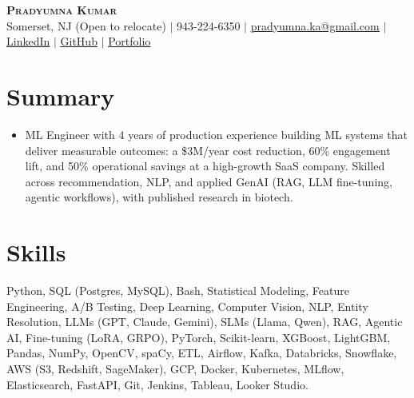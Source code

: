 \documentclass[letterpaper,11pt]{article}
\newcommand{\resumeSubHeadingListStart}{\begin{itemize}[leftmargin=0.15in, label={}]}
\newcommand{\resumeSubHeadingListEnd}{\end{itemize}}
\begin{document}
\begin{center}
    \textbf{\huge \scshape Pradyumna Kumar} \\ \vspace{2pt}
     \small Somerset, NJ (Open to relocate) $|$ \small 943-224-6350 $|$ \href{mailto:pradyumna.ka@gmail.com}{\underline{pradyumna.ka@gmail.com}} $|$
    \href{https://linkedin.com/in/pradyum-kumar/}{\underline{LinkedIn}} $|$
    \href{https://github.com/prad101}{\underline{GitHub}} $|$
    \href{https://prad101.github.io/portfolio/}{\underline{Portfolio}}
\end{center}

\section{Summary}
{\footnotesize
  \resumeSubHeadingListStart
        \item{ML Engineer with 4 years of production experience building ML systems that deliver measurable outcomes: a \$3M/year cost reduction, 60\% engagement lift, and 50\% operational savings at a high-growth SaaS company. Skilled across recommendation, NLP, and applied GenAI (RAG, LLM fine-tuning, agentic workflows), with published research in biotech.}
    \vspace{-5pt}
  \resumeSubHeadingListEnd
}
 \section{Skills}
 \begin{itemize}[leftmargin=0.15in, label={}]
    \footnotesize{\item{ Python, SQL (Postgres, MySQL), Bash, Statistical Modeling, Feature Engineering, A/B Testing, Deep Learning, Computer Vision, NLP, Entity Resolution, LLMs (GPT, Claude, Gemini), SLMs (Llama, Qwen), RAG, Agentic AI, Fine-tuning (LoRA, GRPO), PyTorch, Scikit-learn, XGBoost, LightGBM, Pandas, NumPy, OpenCV, spaCy, ETL, Airflow, Kafka, Databricks, Snowflake, AWS (S3, Redshift, SageMaker), GCP, Docker, Kubernetes, MLflow, Elasticsearch, FastAPI, Git, Jenkins, Tableau, Looker Studio.
    }}
    \vspace{-5pt}
 \end{itemize}
\end{document}
